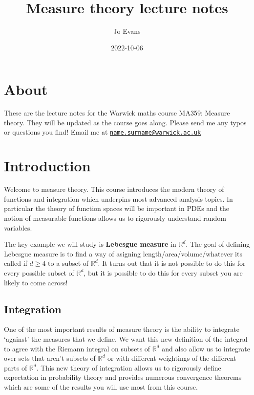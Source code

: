 \documentclass[
]{book}
\title{Measure theory lecture notes}
\author{Jo Evans}
\date{2022-10-06}
\theoremstyle{definition}
\theoremstyle{definition}
\theoremstyle{definition}
\theoremstyle{definition}
\theoremstyle{remark}
\begin{document}
\maketitle

{
\setcounter{tocdepth}{1}
\tableofcontents
}
\hypertarget{about}{%
\chapter*{About}\label{about}}

These are the lecture notes for the Warwick maths course MA359: Measure theory. They will be updated as the course goes along. Please send me any typos or questions you find! Email me at \href{mailto:name.surname@warwick.ac.uk}{\nolinkurl{name.surname@warwick.ac.uk}}

\hypertarget{introduction}{%
\chapter{Introduction}\label{introduction}}

Welcome to measure theory. This course introduces the modern theory of functions and integration which underpins most advanced analysis topics. In particular the theory of function spaces will be important in PDEs and the notion of measurable functions allows us to rigorously understand random variables.

The key example we will study is \textbf{Lebesgue measure} in \(\mathbb{R}^d\). The goal of defining Lebesgue measure is to find a way of asigning length/area/volume/whatever its called if \(d \geq 4\) to a subset of \(\mathbb{R}^d\). It turns out that it is not possible to do this for every possible subset of \(\mathbb{R}^d\), but it is possible to do this for every subset you are likely to come across!

\hypertarget{integration}{%
\section{Integration}\label{integration}}

One of the most important results of measure theory is the ability to integrate `against' the measures that we define. We want this new definition of the integral to agree with the Riemann integral on subsets of \(\mathbb{R}^d\) and also allow us to integrate over sets that aren't subsets of \(\mathbb{R}^d\) or with different weightings of the different parts of \(\mathbb{R}^d\). This new theory of integration allows us to rigorously define expectation in probability theory and provides numerous convergence theorems which are some of the results you will use most from this course.
\end{document}
